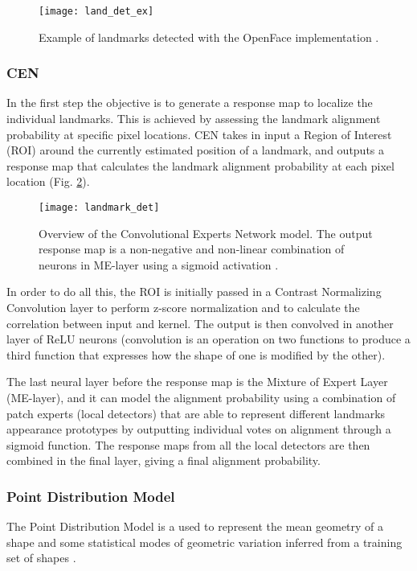\begin{figure}[H]
	\centering
	\texttt{[image: land\_det\_ex]}
	\caption{Example of landmarks detected with the OpenFace implementation \cite{Baltru2018}.}
	\label{fig:land_det_ex}
\end{figure}

\subsubsection{CEN}
In the first step the objective is to generate a response map to localize the individual landmarks. This is achieved by assessing the landmark alignment probability at specific pixel locations. CEN takes in input a Region of Interest (ROI) around the currently estimated position of a landmark, and outputs a response map that calculates the landmark alignment probability at each pixel location (Fig. \ref{fig:landmark_det}).

\begin{figure}[H]
	\centering
	\texttt{[image: landmark\_det]}
	\caption{Overview of the Convolutional Experts Network model. The output response map is a non-negative and non-linear combination of neurons in ME-layer using a sigmoid activation \cite{Baltru2017}.}
	\label{fig:landmark_det}
\end{figure}

In order to do all this, the ROI is initially passed in a Contrast Normalizing Convolution layer to perform z-score normalization and to calculate the correlation between input and kernel. The output is then convolved in another layer of ReLU neurons (convolution is an operation on two functions to produce a third function that expresses how the shape of one is modified by the other).

The last neural layer before the response map is the Mixture of Expert Layer (ME-layer), and it can model the alignment probability using a combination of patch experts (local detectors) that are able to represent different landmarks appearance prototypes by outputting individual votes on alignment through a sigmoid function. The response maps from all the local detectors are then combined in the final layer, giving a final alignment probability.

\subsubsection{Point Distribution Model}
The Point Distribution Model is a used to represent the mean geometry of a shape and some statistical modes of geometric variation inferred from a training set of shapes \cite{wiki:PDM}. 

